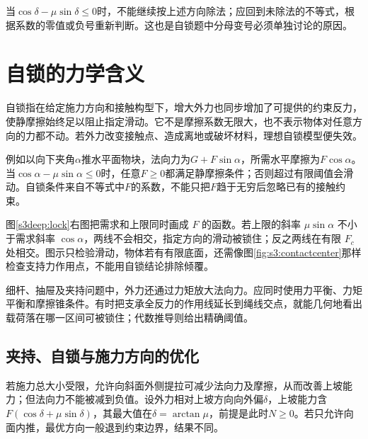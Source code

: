 当$\cos\delta-\mu\sin\delta\le0$时，不能继续按上述方向除法；应回到未除法的不等式，根据系数的零值或负号重新判断。这也是自锁题中分母变号必须单独讨论的原因。

\section{自锁的力学含义}
自锁指在给定施力方向和接触构型下，增大外力也同步增加了可提供的约束反力，使静摩擦始终足以阻止指定滑动。它不是摩擦系数无限大，也不表示物体对任意方向的力都不动。若外力改变接触点、造成离地或破坏材料，理想自锁模型便失效。

例如以向下夹角$\alpha$推水平面物块，法向力为$G+F\sin\alpha$，所需水平摩擦为$F\cos\alpha$。当$\cos\alpha-\mu\sin\alpha\le0$时，任意$F\ge0$都满足静摩擦条件；否则超过有限阈值会滑动。自锁条件来自不等式中$F$的系数，不能只把$F$趋于无穷后忽略已有的接触约束。

图\ref{s3deep:lock}右图把需求和上限同时画成 $F$ 的函数。若上限的斜率 $\mu\sin\alpha$ 不小于需求斜率 $\cos\alpha$，两线不会相交，指定方向的滑动被锁住；反之两线在有限 $F_c$ 处相交。图示只检验滑动，物体若有有限底面，还需像图\ref{fig:s3:contactcenter}那样检查支持力作用点，不能用自锁结论排除倾覆。


细杆、抽屉及夹持问题中，外力还通过力矩放大法向力。应同时使用力平衡、力矩平衡和摩擦锥条件。有时把支承全反力的作用线延长到绳线交点，就能几何地看出载荷落在哪一区间可被锁住；代数推导则给出精确阈值。

\subsection{夹持、自锁与施力方向的优化}
若施力总大小受限，允许向斜面外侧提拉可减少法向力及摩擦，从而改善上坡能力；但法向力不能被减到负值。设外力相对上坡方向向外偏$\delta$，上坡能力含$F(\cos\delta+\mu\sin\delta)$，其最大值在$\delta=\arctan\mu$，前提是此时$N\ge0$。若只允许向面内推，最优方向一般退到约束边界，结果不同。

